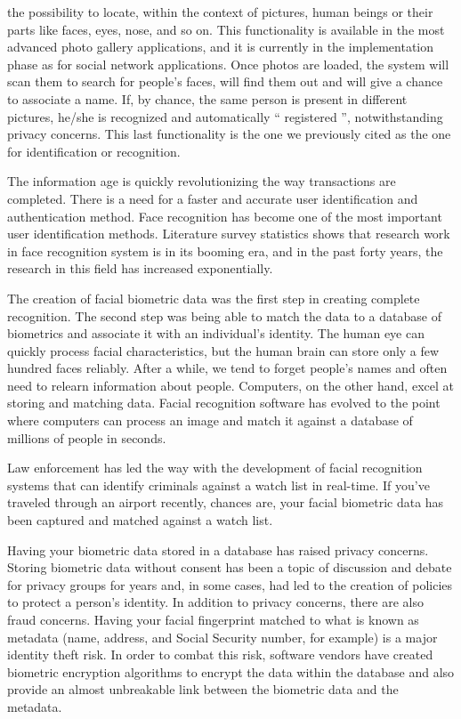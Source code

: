 \documentclass[sigconf]{acmart}
\begin{document}
the possibility to locate, within the context of pictures, human beings or their parts like faces, eyes, nose, and so on. This functionality is available in the most advanced photo gallery applications, and it is currently in the implementation phase as for social network applications. Once photos are loaded, the system will scan them to search for people’s faces, will find them out and will give a chance to associate a name. If, by chance, the same person is present in different pictures, he/she is recognized and automatically “ registered ”, notwithstanding privacy concerns. This last functionality is the one we previously cited as the one for identification or recognition.

The information age is quickly revolutionizing the way transactions are completed. There is a need for a faster and accurate user identification and authentication method. Face recognition has become one of the most important user identification methods. Literature survey statistics shows that research work in face recognition system is in its booming era, and in the past forty years, the research in this field has increased exponentially. 

The creation of facial biometric data was the first step in creating complete recognition. The second step was being able to match the data to a database of biometrics and associate it with an individual’s identity. The human eye can quickly process facial characteristics, but the human brain can store only a few hundred faces reliably. After a while, we tend to forget people’s names and often need to relearn information about people. Computers, on the other hand, excel at storing and matching data. Facial recognition software has evolved to the point where computers can process an image and match it against a database of millions of people in seconds.

Law enforcement has led the way with the development of facial recognition systems that can identify criminals against a watch list in real-time. If you’ve traveled through an airport recently, chances are, your facial biometric data has been captured and matched against a watch list.

Having your biometric data stored in a database has raised privacy concerns. Storing biometric data without consent has been a topic of discussion and debate for privacy groups for years and, in some cases, had led to the creation of policies to protect a person’s identity. In addition to privacy concerns, there are also fraud concerns. Having your facial fingerprint matched to what is known as metadata (name, address, and Social Security number, for example) is a major identity theft risk. In order to combat this risk, software vendors have created biometric encryption algorithms to encrypt the data within the database and also provide an almost unbreakable link between the biometric data and the metadata.
\end{document}
